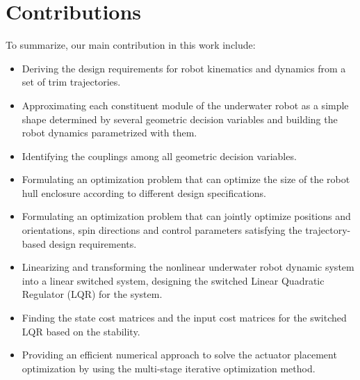 \section{Contributions}
To summarize, our main contribution in this work include:
\begin{itemize}
\item Deriving the design requirements for robot kinematics and dynamics from a set of trim trajectories.
\item Approximating each constituent module of the underwater robot as a simple shape determined by several geometric decision variables and building the robot dynamics parametrized with them.
\item Identifying the couplings among all geometric decision variables.
\item Formulating an optimization problem that can optimize the size of the robot hull enclosure according to different design specifications.
\item Formulating an optimization problem that can jointly optimize positions and orientations, spin directions and control parameters satisfying the trajectory-based design requirements. 
\item Linearizing and transforming the nonlinear underwater robot dynamic system into a linear switched system, designing the switched Linear Quadratic Regulator (LQR) for the system.
\item Finding the state cost matrices and the input cost matrices for the switched  
LQR based on the stability.
\item Providing an efficient numerical approach to solve the actuator placement optimization by using the multi-stage iterative optimization method.
\end{itemize}







